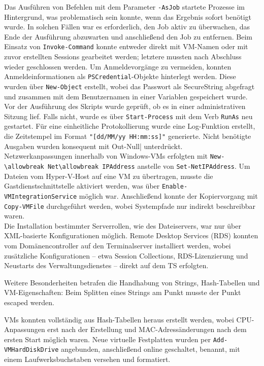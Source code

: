 \documentclass[a4paper,12pt]{article}
\begin{document}
Das Ausführen von Befehlen mit dem Parameter \lstinline|-AsJob| startete Prozesse im Hintergrund, was problematisch sein konnte, wenn das Ergebnis sofort benötigt wurde. In solchen Fällen war es erforderlich, den Job aktiv zu überwachen, das Ende der Ausführung abzuwarten und anschließend den Job zu entfernen. Beim Einsatz von \lstinline|Invoke-Command| konnte entweder direkt mit VM-Namen oder mit zuvor erstellten Sessions gearbeitet werden; letztere mussten nach Abschluss wieder geschlossen werden. Um Anmeldevorgänge zu vermeiden, konnten Anmeldeinformationen als \lstinline|PSCredential|-Objekte hinterlegt werden. Diese wurden über \lstinline|New-Object| erstellt, wobei das Passwort als SecureString abgefragt und zusammen mit dem Benutzernamen in einer Variablen gespeichert wurde. \\ 

Vor der Ausführung des Skripts wurde geprüft, ob es in einer administrativen Sitzung lief. Falls nicht, wurde es über \lstinline|Start-Process| mit dem Verb \lstinline|RunAs| neu gestartet. Für eine einheitliche Protokollierung wurde eine Log-Funktion erstellt, die Zeitstempel im Format \lstinline|"[dd/MM/yy HH:mm:ss]"| generierte. Nicht benötigte Ausgaben wurden konsequent mit \lstinline|| Out-Null| unterdrückt. \\ 

Netzwerkanpassungen innerhalb von Windows-VMs erfolgten mit \lstinline|New-\allowbreak Net\allowbreak IPAddress| anstelle von \lstinline|Set-NetIPAddress|. Um Dateien vom Hyper-V-Host auf eine VM zu übertragen, musste die Gastdienstschnittstelle aktiviert werden, was über \lstinline|Enable-VMIntegrationService| möglich war. Anschließend konnte der Kopiervorgang mit \lstinline|Copy-VMFile| durchgeführt werden, wobei Systempfade nur indirekt beschreibbar waren.\\  

Die Installation bestimmter Serverrollen, wie des Dateiservers, war nur über XML-basierte Konfigurationen möglich. Remote Desktop Services (RDS) konnten vom Domänencontroller auf den Terminalserver installiert werden, wobei zusätzliche Konfigurationen -- etwa Session Collections, RDS-Lizenzierung und Neustarts des Verwaltungsdienstes -- direkt auf dem TS erfolgten.  

Weitere Besonderheiten betrafen die Handhabung von Strings, Hash-Tabellen und VM-Eigenschaften: Beim Splitten eines Strings am Punkt musste der Punkt escaped werden. 

VMs konnten vollständig aus Hash-Tabellen heraus erstellt werden, wobei CPU-Anpassungen erst nach der Erstellung und MAC-Adressänderungen nach dem ersten Start möglich waren. Neue virtuelle Festplatten wurden per \lstinline|Add-VMHardDiskDrive| angebunden, anschließend online geschaltet, benannt, mit einem Laufwerksbuchstaben versehen und formatiert. \\
\end{document}
